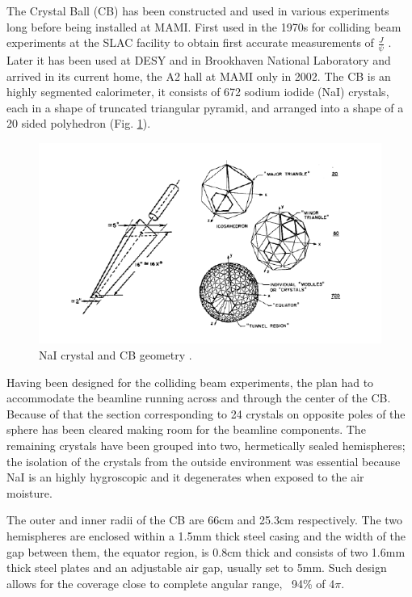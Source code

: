 \indent The Crystal Ball (CB) has been constructed and used in various experiments long before  being  installed  at  MAMI.  First  used  in the 1970s  for colliding  beam experiments at the SLAC facility to obtain first accurate measurements of $\frac{J}{\psi}$ \cite {oreglia}. Later it has been used at DESY and in Brookhaven National Laboratory and arrived in its current home, the A2 hall at MAMI only in 2002. The CB is an highly segmented calorimeter, it consists of 672 sodium iodide (NaI) crystals, each in a shape of truncated triangular pyramid, and arranged into a shape of a 20 sided polyhedron (Fig. \ref{naigeom}).

\begin{figure}[H]
\begin{center}
\includegraphics[scale=0.7]{pictures/png/naigeom.png}
\caption{NaI crystal and CB geometry \cite{a2mami}.}
\label{naigeom}
\end{center}
\end{figure}

\indent Having  been  designed  for  the  colliding  beam  experiments,  the  plan  had  to accommodate  the  beamline  running  across  and  through the  center  of  the  CB. Because of that the section corresponding to 24 crystals on opposite poles of the sphere  has  been  cleared  making  room  for  the  beamline  components.  The remaining crystals have been grouped into two, hermetically sealed hemispheres; the isolation of the crystals from the outside environment was essential because NaI is an highly hygroscopic and it degenerates when exposed to the air moisture.

\indent The outer and inner radii of the CB are 66cm and 25.3cm respectively. The two hemispheres are enclosed within a 1.5mm thick steel casing and the width of the gap between them, the equator region, is 0.8cm thick and consists of two 1.6mm thick steel plates and an adjustable air gap, usually set to 5mm. Such design allows for the coverage close to complete angular range, ~94\% of 4$\pi$.

